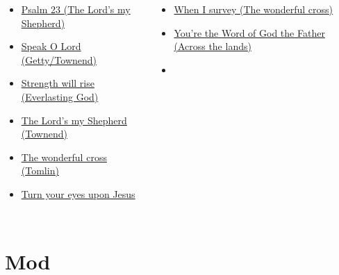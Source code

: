 \documentclass{beamer}
\begin{document}
            \begin{frame}[t]
            \begin{columns}[t]
        \begin{itemize}
    \item \hyperlink{The Lord's my Shepherd['Psalm 23'](Townend)}{Psalm 23 (The Lord's my Shepherd)} \phantom{ 1}
    \item \hyperlink{Speak O Lord[](Getty/Townend)}{Speak O Lord (Getty/Townend)} \phantom{ 1 1 1 1}
            \item \hyperlink{Everlasting God['Strength will rise']}{Strength will rise (Everlasting God)} \phantom{}
    \item \hyperlink{The Lord's my Shepherd['Psalm 23'](Townend)}{The Lord's my Shepherd (Townend)} \phantom{ 1 1}
    \item \hyperlink{The wonderful cross['When I survey'](Tomlin)}{The wonderful cross (Tomlin)} \phantom{ 1 1 1 1}
    \item \hyperlink{Turn your eyes upon Jesus[]}{Turn your eyes upon Jesus } \phantom{ 1 1 1 1 1}
\end{itemize}
        \begin{itemize}
            \item \hyperlink{The wonderful cross['When I survey'](Tomlin)}{When I survey (The wonderful cross)} \phantom{}
                    \item \hyperlink{Across the lands["You're the Word of God the Father"](Townend)}{You're the Word of God the Father (Across the lands)} \phantom{}
    \item[] \phantom{1}\end{itemize}


\end{columns}

\end{frame}
\section{Mod}
\end{document}
